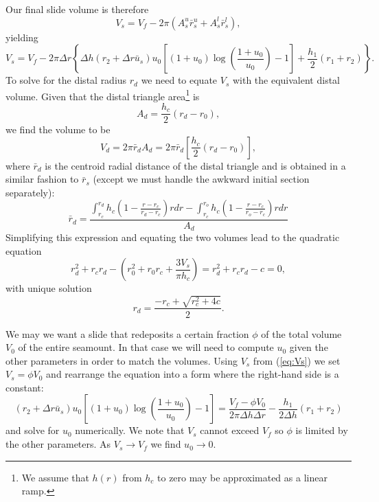 \documentclass[12pt,letterpaper,margin=0.5in]{report}
\begin{document}
Our final slide volume is therefore
\begin{equation}
V_s = V_f - 2 \pi \left (A^u_s \bar{r}^u_s + A^l_s \bar{r}^l_s \right ),
\end{equation}
yielding
\begin{equation}
V_s = V_f - 2 \pi \Delta r \left \{ \Delta h \left ( r_2 + \Delta r\bar{u}_s \right ) u_0 \left [ (1 + u_0) \log \left (\frac{1 + u_0}{u_0} \right ) - 1 \right ] + \frac{h_1}{2} (r_1 + r_2) \right \}.
\label{eq:Vs}
\end{equation}
To solve for the distal radius $r_d$ we need to equate $V_s$ with the equivalent distal volume.
Given that the distal triangle area\footnote{We assume that $h(r)$ from $h_c$ to zero may be approximated as a linear ramp.} is
\begin{equation}
A_d = \frac{h_c}{2} (r_d - r_0),
\end{equation}
we find the volume to be
\begin{equation}
V_d = 2 \pi \bar{r}_d A_d = 2 \pi \bar{r}_d \left [ \frac{h_c}{2} (r_d - r_0) \right ],
\end{equation}
where $\bar{r}_d$ is the centroid radial distance of the distal triangle and is obtained in a similar fashion to $\bar{r}_s$ (except
we must handle the awkward initial section separately):
\begin{equation}
\bar{r}_d = \frac{\int_{r_c}^{r_d}h_c \left (1 - \frac{r - r_c}{r_d - r_c} \right )rdr - \int_{r_c}^{r_o}h_c \left (1 - \frac{r - r_c}{r_o- r_c} \right )rdr}{A_d}
\end{equation}
Simplifying this expression and equating the two volumes lead to the quadratic equation
\begin{equation}
r_d^2 + r_c r_d - \left (r_0^2 + r_0 r_c + \frac{3 V_s}{\pi h_c}\right ) = r_d^2 + r_c r_d - c = 0,
\end{equation}
with unique solution
\begin{equation}
r_d = \frac{-r_c + \sqrt{r_c^2 + 4c}}{2}.
\end{equation}

We may we want a slide that redeposits a certain fraction $\phi$ of the total volume $V_0$ of the entire seamount. In that
case we will need to compute $u_0$ given the other parameters in order to match the volumes.  Using
$V_s$ from (\ref{eq:Vs}) we set $V_s = \phi V_0$ and rearrange the equation into a form where the right-hand side is a constant:
\begin{equation}
\left ( r_2 + \Delta r \bar{u}_s \right ) u_0 \left [ (1 + u_0) \log \left (\frac{1 + u_0}{u_0} \right ) - 1 \right ] = \frac{V_f - \phi V_0}{2 \pi \Delta h \Delta r} - \frac{h_1}{2\Delta h}(r_1 + r_2)
\end{equation}
and solve for $u_0$ numerically.  We note that $V_s$ cannot exceed $V_f$ so $\phi$ is limited by the other parameters.  As
$V_s \rightarrow V_f$ we find $u_0 \rightarrow 0$.
\end{document}
